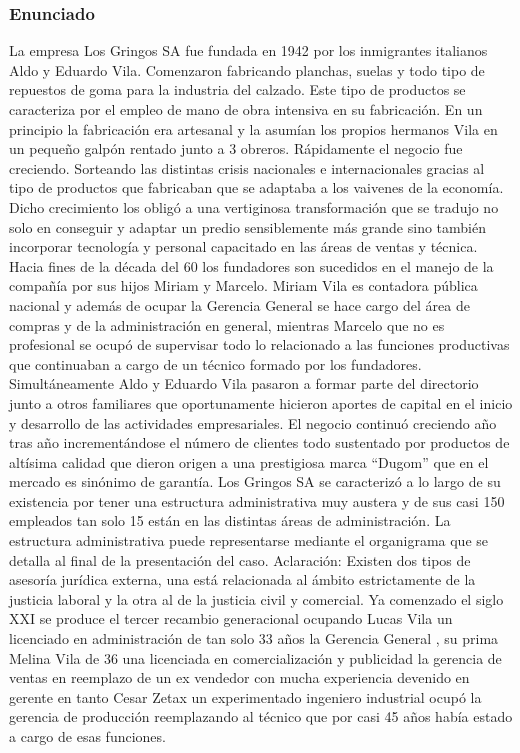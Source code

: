 \documentclass[a4paper,10pt]{article}
\begin{document}
	\subsubsection{Enunciado}
	La empresa Los Gringos SA fue fundada en 1942 por los inmigrantes italianos Aldo y Eduardo Vila. Comenzaron fabricando planchas, suelas y todo tipo de repuestos de goma para la industria del calzado. Este tipo de productos se caracteriza por el empleo de mano de obra intensiva en su fabricación.\newline
	En un principio la fabricación era artesanal y la asumían los propios hermanos Vila en un pequeño galpón rentado junto a 3 obreros. Rápidamente el negocio fue creciendo. Sorteando las distintas crisis nacionales e internacionales gracias al tipo de productos que fabricaban que se adaptaba a los vaivenes de la economía.\newline
	Dicho crecimiento los obligó a una vertiginosa transformación que se tradujo no solo en conseguir y adaptar un predio sensiblemente más grande sino también incorporar tecnología y personal capacitado en las áreas de ventas y técnica.\newline
	Hacia fines de la década del 60 los fundadores son sucedidos en el manejo de la compañía por sus hijos Miriam y Marcelo.
	Miriam Vila es contadora pública nacional y además de ocupar la Gerencia General se hace cargo del área de compras y de la administración en general, mientras Marcelo que no es profesional se ocupó de supervisar todo lo relacionado a las funciones productivas que continuaban a cargo de un técnico formado por los fundadores.
	Simultáneamente Aldo y Eduardo Vila pasaron a formar parte del directorio junto a otros familiares que oportunamente hicieron aportes de capital en el inicio y desarrollo de las actividades empresariales.\newline
	El negocio continuó creciendo año tras año incrementándose el número de clientes todo sustentado por productos de altísima calidad que dieron origen a una prestigiosa marca “Dugom” que en el mercado es sinónimo de garantía.\newline
	Los Gringos SA se caracterizó a lo largo de su existencia por tener una estructura administrativa muy austera y de sus casi 150 empleados tan solo 15 están en las distintas áreas de administración. La estructura administrativa puede representarse mediante el organigrama que se detalla al final de la presentación del caso.\newline
	Aclaración: Existen dos tipos de asesoría jurídica externa, una está relacionada al ámbito estrictamente de la justicia laboral y la otra al de la justicia civil y comercial. Ya comenzado el siglo XXI se produce el tercer recambio generacional ocupando Lucas Vila un licenciado en administración de tan solo 33 años la Gerencia General , su prima Melina Vila de 36 una licenciada en comercialización y publicidad la gerencia de ventas en reemplazo de un ex vendedor con mucha experiencia devenido en gerente en tanto Cesar Zetax un experimentado ingeniero industrial ocupó la gerencia de producción reemplazando al técnico que por casi 45 años había estado a cargo de esas funciones.\newline
\end{document}
